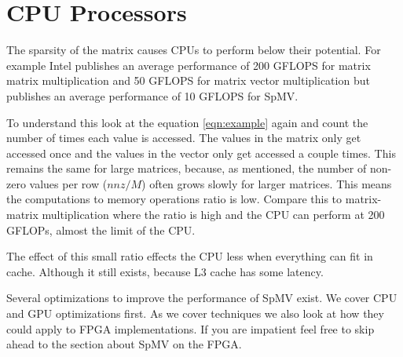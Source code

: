 \section{CPU Processors}
\par The sparsity of the matrix causes CPUs to perform below their potential. For example Intel publishes an average performance of 200 GFLOPS for matrix matrix multiplication and 50 GFLOPS for matrix vector multiplication but publishes an average performance of 10 GFLOPS for SpMV.
\par To understand this look at the equation \ref{eqn:example} again and count the number of times each value is accessed. The values in the matrix only get accessed once and the values in the vector only get accessed a couple times. This remains the same for large matrices, because, as mentioned, the number of non-zero values per row ($nnz/M$) often grows slowly for larger matrices. This means the computations to memory operations ratio is low. Compare this to matrix-matrix multiplication where the ratio is high and the CPU can perform at 200 GFLOPs, almost the limit of the CPU.
\par The effect of this small ratio effects the CPU less when everything can fit in cache. Although it still exists, because L3 cache has some latency.
\par Several optimizations to improve the performance of SpMV exist. We cover CPU and GPU optimizations first. As we cover techniques we also look at how they could apply to FPGA implementations. If you are impatient feel free to skip ahead to the section about SpMV on the FPGA.

